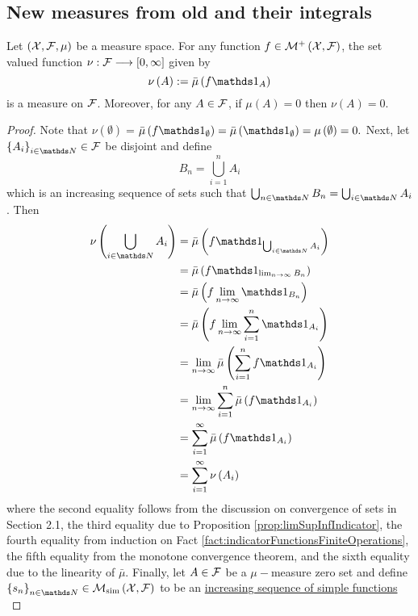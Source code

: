 \subsection{New measures from old and their integrals}
\begin{prop}
\label{prop:densities}Let $\left(\mathcal{X},\mathcal{F},\mu\right)$ be a measure
space. For any function $f\in\mathcal{M}^{+}\left(\mathcal{X},\mathcal{F}\right)$, the set
valued function $\nu:\mathcal{F}\longrightarrow\left[0,\infty\right]$ given
by
\[
\nu\left(A\right):=\lebInt{\mu}{f\indicate_{A}}
\]
is a measure on $\mathcal{F}$. Moreover, for any $A\in\mathcal{F}$, if $\mu\left(A\right)=0$
then $\nu\left(A\right)=0$.
\end{prop}

\begin{proof}
Note that $\nu\left(\emptyset\right)=$$\lebInt{\mu}{f\indicate_{\emptyset}}=\lebInt{\mu}{\indicate_{\emptyset}}=\mu\left(\emptyset\right)=0.$
Next, let $\left\{ A_{i}\right\} _{i\in\N}\in\F$ be disjoint and
define
\[
B_{n}=\bigcup_{i=1}^{n}A_{i}
\]
which is an increasing sequence of sets such that $\bigcup_{n\in\N}B_{n}=\bigcup_{i\in\N}A_{i}$.
Then
\begin{align*}
\nu\left(\bigcup_{i\in\N}A_{i}\right) & =\lebInt{\mu}{f\indicate_{\bigcup_{i\in\N}A_{i}}}\\
 & =\lebInt{\mu}{f\indicate_{\lim_{n\to\infty}B_{n}}}\\
 & =\lebInt{\mu}{f\lim_{n\to\infty}\indicate_{B_{n}}}\\
 & =\lebInt{\mu}{f\lim_{n\to\infty}\sum_{i=1}^{n}\indicate_{A_{i}}}\\
 & =\lim_{n\to\infty}\lebInt{\mu}{\sum_{i=1}^{n}f\indicate_{A_{i}}}\\
 & =\lim_{n\to\infty}\sum_{i=1}^{n}\lebInt{\mu}{f\indicate_{A_{i}}}\\
 & =\sum_{i=1}^{\infty}\lebInt{\mu}{f\indicate_{A_{i}}}\\
 & =\sum_{i=1}^{\infty}\nu\left(A_{i}\right)
\end{align*}
where the second equality follows from the discussion on convergence
of sets in Section 2.1, the third equality due to Proposition \ref{prop:limSupInfIndicator},
the fourth equality from induction on Fact \ref{fact:indicatorFunctionsFiniteOperations},
the fifth equality from the monotone convergence theorem, and the
sixth equality due to the linearity of $\bar{\mu}$. Finally, let
$A\in\F$ be a $\mu-$measure zero set and define $\left\{ s_{n}\right\} _{n\in\N}\in\mathcal{M}_{\textnormal{sim}}\left(\X,\F\right)$
to be an \hyperref[prop:simpleFunctionMonotoneConvergence]{increasing sequence of simple functions}
$$
\end{proof}
